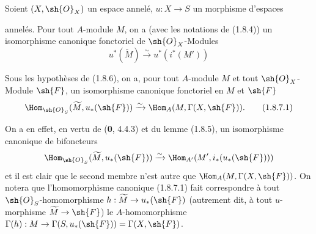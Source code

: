 \begin{corollary}[1.8.6]
\label{ega2:addendum:I.1.8.6-fr}
Soient $(X,\sh{O}_X)$ un espace annelé, $u:X\to S$ un morphisme
d'espaces
annelés. Pour tout $A$-module $M$, on a (avec les notations de \textup{(1.8.4))} un
isomorphisme canonique fonctoriel de $\sh{O}_X$-Modules
\begin{equation}
\label{ega2:addendum:I.1.8.6.1-fr}
  u^*(\widetilde M)\xrightarrow{\sim} u^*(i^*(M'))
\tag{1.8.6.1}
\end{equation}
\end{corollary}

\begin{corollary}[1.8.7]
\label{ega2:addendum:I.1.8.7-fr}
Sous les hypothèses de \textup{(1.8.6)}, on a, pour tout $A$-module $M$ et tout
$\sh{O}_X$-Module $\sh{F}$, un isomorphisme canonique fonctoriel en
$M$ et $\sh{F}$
\begin{equation}
\label{ega2:addendum:I.1.8.7.1-fr}
  \Hom_{\sh{O}_S}(\widetilde M,u_*(\sh{F}))
  \xrightarrow{\sim}\Hom_A(M,\Gamma(X,\sh{F})).
\tag{1.8.7.1}
\end{equation}
\end{corollary}

On a en effet, en vertu de (\textbf{0}, 4.4.3) et du lemme (1.8.5), un
isomorphisme canonique de bifoncteurs
\[
  \Hom_{\sh{O}_S}(\widetilde M,u_*(\sh{F}))
  \xrightarrow{\sim}\Hom_{A'}(M',i_*(u_*(\sh{F})))
\]
et il est clair que le second membre n'est autre que
$\Hom_A(M,\Gamma(X,\sh{F}))$. On notera que l'homomorphisme canonique
(1.8.7.1) fait correspondre à tout $\sh{O}_S$-homomorphisme
$h:\widetilde M\to u_*(\sh{F})$ (autrement dit, à tout $u$-morphisme
$\widetilde M\to\sh{F}$) le $A$-homomorphisme
$\Gamma(h):M\to\Gamma(S,u_*(\sh{F}))=\Gamma(X,\sh{F})$.


